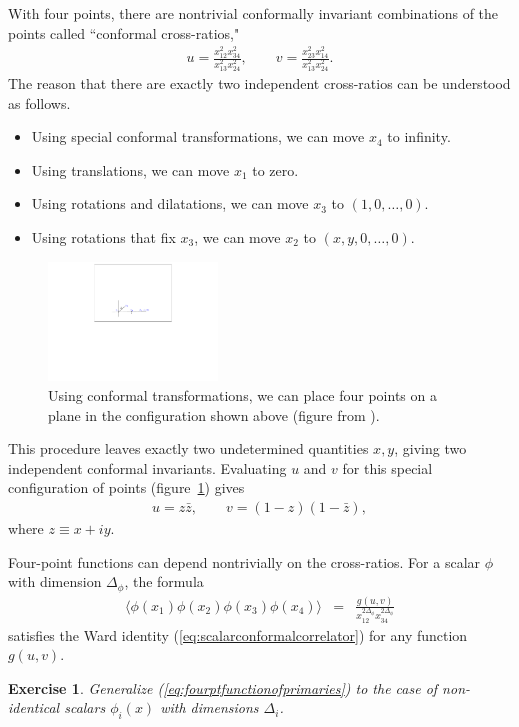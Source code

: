 \documentclass[11pt]{ws-rv9x6}
\newcommand\be{\begin{eqnarray}}
\newcommand\ee{\end{eqnarray}}
\newcommand\f\phi
\newcommand\<\langle
\renewcommand\>\rangle
\renewcommand\.{\cdot}
\newcommand\De{\Delta}
\newtheorem{exercise}{Exercise}[section]
\begin{document}
With four points, there are nontrivial conformally invariant combinations of the points called ``conformal cross-ratios,"
\be
\label{eq:definitionofcrossratios}
u = \frac{x_{12}^2 x_{34}^2}{x_{13}^2 x_{24}^2},\qquad
v = \frac{x_{23}^2 x_{14}^2}{x_{13}^2 x_{24}^2}.
\ee
The reason that there are exactly two independent cross-ratios can be understood as follows.
\begin{itemize}
\item Using special conformal transformations, we can move $x_4$ to infinity.
\item Using translations, we can move $x_1$ to zero.
\item Using rotations and dilatations, we can move $x_3$ to $(1,0,\dots,0)$.
\item Using rotations that fix $x_3$, we can move $x_2$ to $(x,y,0,\dots,0)$.
\end{itemize}

\begin{figure}
\begin{center}
\includegraphics[width=0.4\textwidth]{fig-z}
\end{center}
\caption{\label{fig:zplane} Using conformal transformations, we can place four points on a plane in the configuration shown above (figure from \cite{Hogervorst:2013sma}).}
\end{figure}

This procedure leaves exactly two undetermined quantities $x,y$, giving two independent conformal invariants. Evaluating $u$ and $v$ for this special configuration of points (figure~\ref{fig:zplane}) gives
\be
u=z\bar z,\qquad v=(1-z)(1-\bar z),
\ee
where $z\equiv x+iy$.

Four-point functions can depend nontrivially on the cross-ratios.  For a scalar $\f$ with dimension $\De_\phi$, the formula
\be
\label{eq:fourptfunctionofprimaries}
\<\f(x_1)\f(x_2)\f(x_3)\f(x_4)\> &=& \frac{g(u,v)}{x_{12}^{2\De_\f}x_{34}^{2\De_\f}}
\ee
satisfies the Ward identity (\ref{eq:scalarconformalcorrelator}) for any function $g(u,v)$. 
\begin{exercise}
Generalize (\ref{eq:fourptfunctionofprimaries}) to the case of non-identical scalars $\f_i(x)$ with dimensions $\De_i$.
\end{exercise}
\end{document}
